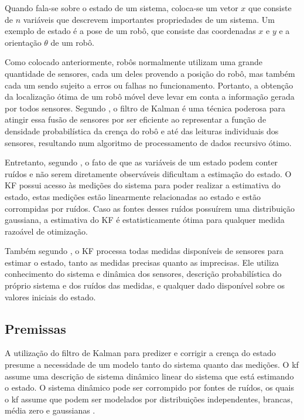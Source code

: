 \documentclass[acronym, symbols, table, deposito]{fei}
\begin{document}
			Quando fala-se sobre o estado de um sistema, coloca-se um vetor $x$ que consiste de $n$ variáveis que descrevem importantes propriedades de um sistema. Um exemplo de estado é a pose de um robô, que consiste das coordenadas $x$ e $y$ e a orientação $\theta$ de um robô.
			
			Como colocado anteriormente, robôs normalmente utilizam uma grande quantidade de sensores, cada um deles provendo a posição do robô, mas também cada um sendo sujeito a erros ou falhas no funcionamento. Portanto, a obtenção da localização ótima de um robô móvel deve levar em conta a informação gerada por todos sensores. Segundo \textcite{siegwart2011introduction}, o filtro de Kalman é uma técnica poderosa para atingir essa fusão de sensores por ser eficiente ao representar a função de densidade probabilística da crença do robô e até das leituras individuais dos sensores, resultando num algoritmo de processamento de dados recursivo ótimo.
			
			Entretanto, segundo \textcite{phdthesisNegenborn}, o fato de que as variáveis de um estado podem conter ruídos e não serem diretamente observáveis dificultam a estimação do estado. O KF possui acesso às medições do sistema para poder realizar a estimativa do estado, estas medições estão linearmente relacionadas ao estado e estão corrompidas por ruídos. Caso as fontes desses ruídos possuírem uma distribuição gaussiana, a estimativa do KF é estatisticamente ótima para qualquer medida razoável de otimização.
			
			Também segundo \textcite{phdthesisNegenborn}, o KF processa todas medidas disponíveis de sensores para estimar o estado, tanto as medidas precisas quanto as imprecisas. Ele utiliza conhecimento do sistema e dinâmica dos sensores, descrição probabilística do próprio sistema e dos ruídos das medidas, e qualquer dado disponível sobre os valores iniciais do estado.
			
		\subsection{Premissas}
		
			A utilização do filtro de Kalman para predizer e corrigir a crença do estado presume a necessidade de um modelo tanto do sistema quanto das medições. O \acrshort{kf} assume uma descrição de sistema dinâmico linear do sistema que está estimando o estado. O sistema dinâmico pode ser corrompido por fontes de ruídos, os quais o \acrshort{kf} assume que podem ser modelados por distribuições independentes, brancas, média zero e gaussianas \cite{urrea2021kalman}.
			
\end{document}
